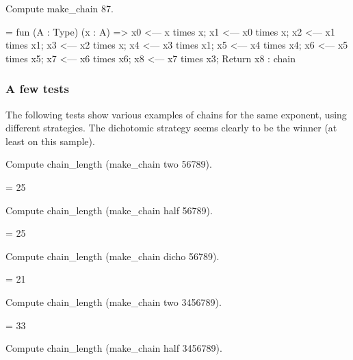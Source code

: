 \begin{Coqsrc}
Compute make_chain 87.
\end{Coqsrc}

\begin{Coqanswer}
 =  fun (A : Type) (x : A) =>
       x0 <--- x times x;
       x1 <--- x0 times x;
       x2 <--- x1 times x1;
       x3 <--- x2 times x;
       x4 <--- x3 times x1;
       x5 <--- x4 times x4;
       x6 <--- x5 times x5;
       x7 <--- x6 times x6; 
       x8 <--- x7 times x3; 
       Return x8
     : chain 
\end{Coqanswer}


\subsubsection{A few tests}
\label{sect:test-strat}

The following tests show various examples of chains for the same exponent, using different strategies. The dichotomic strategy seems clearly to be the winner (at least on this sample).

\begin{Coqsrc}
Compute chain_length (make_chain two 56789).
\end{Coqsrc}

\begin{Coqanswer}
= 25%
\end{Coqanswer}

\begin{Coqsrc}
Compute chain_length (make_chain half 56789).
\end{Coqsrc}

\begin{Coqanswer}
 = 25%
\end{Coqanswer}

\begin{Coqsrc}
Compute chain_length (make_chain dicho 56789).
\end{Coqsrc}

\begin{Coqanswer}
= 21%
\end{Coqanswer}

\begin{Coqsrc}
Compute chain_length (make_chain two 3456789).
\end{Coqsrc}

\begin{Coqanswer}
= 33%
\end{Coqanswer}

\begin{Coqsrc}
Compute chain_length (make_chain half 3456789).
\end{Coqsrc}

